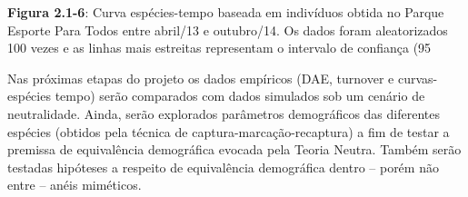 \textbf{Figura 2.1-6}: Curva espécies-tempo baseada em indivíduos obtida no Parque Esporte Para Todos entre abril/13 e outubro/14. Os dados foram aleatorizados 100 vezes e as linhas mais estreitas representam o intervalo de confiança (95%

Nas próximas etapas do projeto os dados empíricos (DAE, turnover e curvas-espécies tempo) serão comparados com dados simulados sob um cenário de neutralidade. Ainda, serão explorados parâmetros demográficos das diferentes espécies (obtidos pela técnica de captura-marcação-recaptura) a fim de testar a premissa de equivalência demográfica evocada pela Teoria Neutra. Também serão testadas hipóteses a respeito de equivalência demográfica dentro – porém não entre – anéis miméticos.